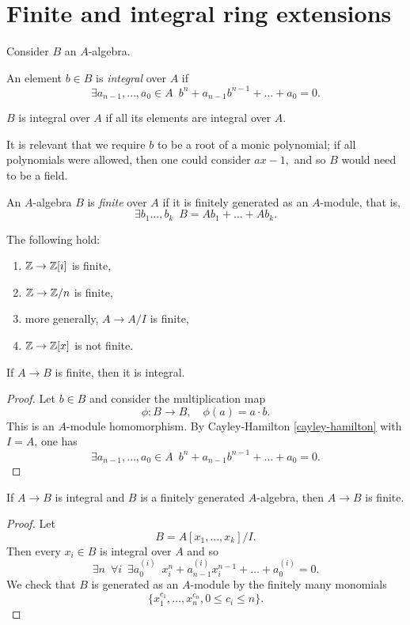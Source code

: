 \section{Finite and integral ring extensions}
Consider $B$ an $A$-algebra.

\begin{df}
  An element $b \in B$ is \textit{integral} over $A$ if
  \[ \exists a_{n-1}, \dotsc, a_0 \in A \enspace b^n + a_{n-1} b^{n-1} + \dotso + a_0 = 0.\]

  $B$ is integral over $A$ if all its elements are integral over $A$.
\end{df}

\begin{note}
  It is relevant that we require \(b\) to be a root of a monic polynomial; if all polynomials were allowed, then one could consider \(ax - 1,\) and so \(B\) would need to be a field.
\end{note}

\begin{df}
  An $A$-algebra $B$ is \textit{finite} over $A$ if it is finitely generated as an $A$-module, that is,
  \[ \exists b_1 \dotsc, b_k \enspace B = A b_1 + \dotso + A b_k.\]
\end{df}

\begin{example}
  The following hold:
  \begin{enumerate}
  \item $\mathbb Z \to \mathbb Z[i]$ is finite,
  \item $\mathbb Z \to \mathbb Z /{n}$ is finite,
  \item more generally, $A \to A/{I}$ is finite,
  \item $\mathbb Z \to \mathbb Z[x]$ is not finite.
  \end{enumerate}
\end{example}

\begin{lemma}
  If $A \to B$ is finite, then it is integral.
\end{lemma}
\begin{proof}
  Let $b \in B$ and consider the multiplication map
  \[ \phi \colon B \to B, \quad \phi(a) = a \cdot b.\]
  This is an $A$-module homomorphism.
  By Cayley-Hamilton \cref{cayley-hamilton} with $I = A$, one has
  \[ \exists a_{n-1}, \dotsc, a_0 \in A \enspace b^n + a_{n-1} b^{n-1} + \dotso + a_0 = 0.\]
\end{proof}

\begin{lemma}
  \label{lem-integral-fingen-fin}
  If $A \to B$ is integral and $B$ is a finitely generated $A$-algebra, then $A \to B$ is finite.
\end{lemma}
\begin{proof}
  Let
  \[ B = A[x_1, \dotsc, x_k]/{I}.\]
  Then every $x_i \in B$ is integral over $A$ and so
  \[ \exists n \enspace \forall i \enspace \exists a_0^{(i)} \enspace x_i^n + a_{n-1}^{(i)}x_i^{n-1} + \dotso + a_0^{(i)} = 0.\]
  We check that $B$ is generated as an $A$-module by the finitely many monomials
  \[ \{ x_1^{c_1}, \dotsc, x_n^{c_n}, 0 \leq c_i \leq n\}.\]
\end{proof}


